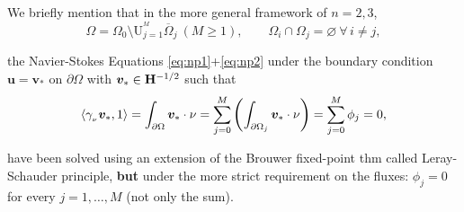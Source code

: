 \noindent\rlap{\rule[1.5ex]{0.495\textwidth}{.2pt}}\vspace{-0.3em}


We briefly mention that in the more general framework of $n=2,3$, 
\begin{equation*}
\Omega=\Omega_0\setminus \mathrm{U}_{\scriptscriptstyle j=1}^{^{\scriptscriptstyle M}} \overline{\Omega}_j\ (M\geq 1),\qquad \Omega_i\cap\Omega_j=\varnothing\ \forall\, i\neq j,
\end{equation*}

the Navier-Stokes Equations \eqref{eq:np1}+\eqref{eq:np2} under the boundary condition $\bm u=\bm v_*$ on $\partial \Omega$ with $\bm v_*\in \mathbf{H}^{-1/2}$ such that
\vspace{-0.5em}
\begin{equation*}
\left\langle \gamma_{_\nu}\bm v_*,1 \right\rangle=\int_{\partial\Omega}\bm v_*\cdot\nu=\sum_{j=0}^M \left( \int_{\partial\Omega_j} \bm v_*\cdot\nu \right)=\sum_{j=0}^M \phi_j = 0,
\end{equation*}

have been solved using an extension of the Brouwer fixed-point thm called Leray-Schauder principle, \textbf{but} under the more strict requirement on the fluxes: $\phi_j=0$ for every $j=1,\dots,M$ (not only the sum).

\noindent\rlap{\rule[1.5ex]{0.495\textwidth}{.2pt}}

\newpage







